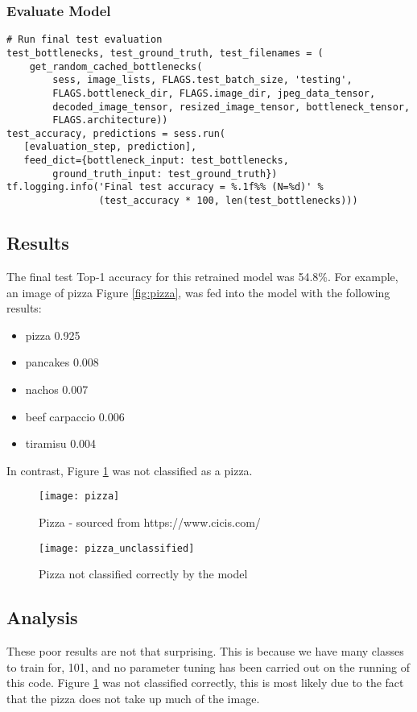 \tocless\subsubsection{Evaluate Model}
\begin{lstlisting}[style=Python]
# Run final test evaluation
test_bottlenecks, test_ground_truth, test_filenames = (
    get_random_cached_bottlenecks(
        sess, image_lists, FLAGS.test_batch_size, 'testing',
        FLAGS.bottleneck_dir, FLAGS.image_dir, jpeg_data_tensor,
        decoded_image_tensor, resized_image_tensor, bottleneck_tensor,
        FLAGS.architecture))
test_accuracy, predictions = sess.run(
   [evaluation_step, prediction],
   feed_dict={bottleneck_input: test_bottlenecks,
        ground_truth_input: test_ground_truth})
tf.logging.info('Final test accuracy = %.1f%% (N=%d)' %
                (test_accuracy * 100, len(test_bottlenecks)))
\end{lstlisting}

\tocless\subsection{Results}
The final test Top-1 accuracy for this retrained model was 54.8\%.
For example, an image of pizza Figure \ref{fig:pizza}, was fed into the model with the following results:
\begin{itemize}
    \item{pizza 0.925}
    \item{pancakes 0.008}
    \item{nachos 0.007}
    \item{beef carpaccio 0.006}
    \item{tiramisu 0.004}
\end{itemize}
In contrast, Figure \ref{fig:pizza_unclassified} was not classified as a pizza.

\begin{figure}[h] 
\centering
  \label{pizzas} 
  \begin{minipage}[h]{0.5\linewidth}
    \centering
    \texttt{[image: pizza]} 
    \caption{Pizza - sourced from https://www.cicis.com/} 
  \label{fig:pizza}
    \vspace{4ex}
  \end{minipage}%
  \begin{minipage}[h]{0.5\linewidth}
    \centering
    \texttt{[image: pizza\_unclassified]} 
    \caption{Pizza not classified correctly by the model} 
  \label{fig:pizza_unclassified}
    \vspace{4ex}
  \end{minipage} 
\end{figure}

\tocless\subsection{Analysis}
These poor results are not that surprising.
This is because we have many classes to train for, 101, and no parameter tuning has been carried out on the running of this code.
Figure \ref{fig:pizza_unclassified} was not classified correctly, this is most likely due to the fact that the pizza does not take up much of the image.

